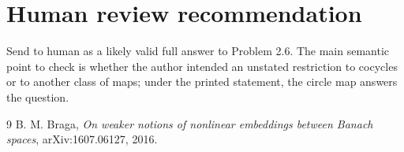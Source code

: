 \documentclass[11pt]{article}
\begin{document}
\section*{Human review recommendation}

Send to human as a likely valid full answer to Problem 2.6. The main semantic
point to check is whether the author intended an unstated restriction to
cocycles or to another class of maps; under the printed statement, the circle
map answers the question.

\begin{thebibliography}{9}
B. M. Braga,
\emph{On weaker notions of nonlinear embeddings between Banach spaces},
arXiv:1607.06127, 2016.
\end{thebibliography}
\end{document}
